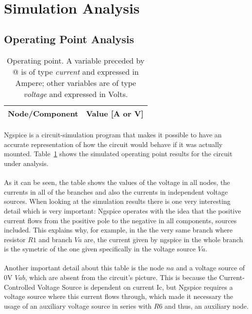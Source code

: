 \section{Simulation Analysis}
\label{sec:simulation}

\subsection{Operating Point Analysis}
\begin{table}[h] \centering
  \begin{tabular}{|l|r|}
    \hline    
    {\bf Node/Component} & {\bf Value [A or V]} \\ \hline
    
  \end{tabular}
  \caption{Operating point. A variable preceded by @ is of type {\em current}
    and expressed in Ampere; other variables are of type {\it voltage} and expressed in
    Volts.}
  \label{tab:op}
\end{table}



\paragraph{}Ngspice is a circuit-simulation program that makes it possible to have an accurate representation of how the circuit would behave if it was actually mounted. Table~\ref{tab:op} shows the simulated operating point results for the circuit
under analysis.


\paragraph{}As it can be seen, the table shows the values of the voltage in all nodes, the currents in all of the branches and also the currents in independent voltage sources. When looking at the simulation results there is one very interesting detail which is very important: Ngspice operates with the idea that the positive current flows from the positive pole to the negative in all components, sources included. This explains why, for example, in the the very same branch where resistor $R1$ and branch $Va$ are, the current given by ngspice in the whole branch is the symetric of the one given specifically in the voltage source $Va$.
\paragraph{} Another important detail about this table is the node $na$ and a voltage source of 0V $Vab$, which are absent from the circuit's picture. This is because the Current-Controlled Voltage Source is dependent on current Ic, but Ngspice requires a voltage source where this current flows through, which made it necessary the usage of an auxiliary voltage source in series with $R6$ and thus, an auxiliary node.  


